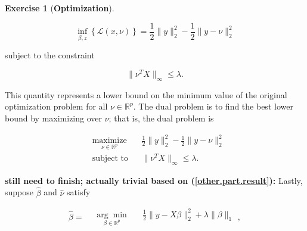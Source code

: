 \documentclass{article}
\theoremstyle{definition}
\newtheorem{exercise}{Exercise}
\theoremstyle{definition}
\theoremstyle{definition}
\theoremstyle{definition}
\begin{document}
\begin{exercise}[\textbf{Optimization}]
\begin{enumerate}[(a)]
 

%
%
% 

\begin{equation}\label{2018.screen.5.a.dual}
 \inf_{\beta, z} \left\{ \mathcal{L}(x, \nu)\right\}  = \frac{1}{2} \lVert y \rVert_2^2 - \frac{1}{2} \lVert y - \nu \rVert_2^2 
\end{equation}

subject to the constraint

\[
\lVert \nu^TX \rVert_\infty \leq \lambda.
\]


This quantity represents a lower bound on the minimum value of the original optimization problem for all \(\nu \in \mathbb{R}^p\). The dual problem is to find the best lower bound by maximizing over \(\nu\); that is, the dual problem is

\[
\begin{aligned}
& \underset{\nu \in \mathbb{R}^p}{\text{maximize}}
& & \frac{1}{2} \lVert y \rVert_2^2 - \frac{1}{2} \lVert y - \nu \rVert_2^2  \\
& \text{subject to}
& & \lVert \nu^TX \rVert_\infty \leq \lambda.
\end{aligned}
\]

\textbf{still need to finish; actually trivial based on (\ref{other.part.result}):} Lastly, suppose \(\hat{\beta}\) and \(\hat{\nu}\) satisfy

\[
\hat{\beta} = 
\begin{aligned}
& \underset{\beta \in \mathbb{R}^p}{\arg \min}
& & \frac{1}{2} \lVert y - X \beta \rVert_2^2 + \lambda \lVert \beta \rVert_1
\end{aligned},
\]


\end{enumerate}
\end{exercise}
\end{document}
